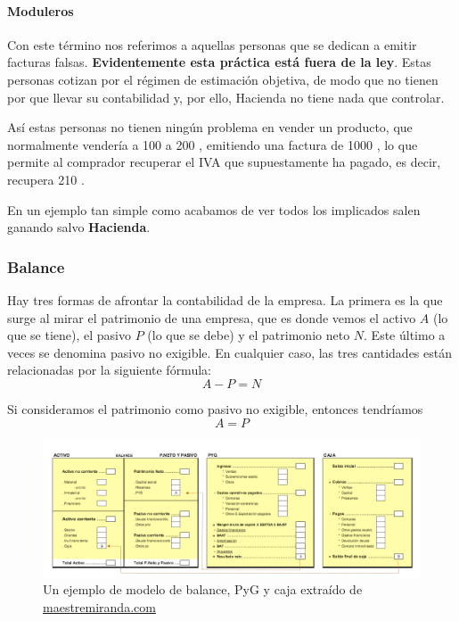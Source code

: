 \documentclass[nochap,palatino,shortheader]{apuntes}
\newcommand{\study}[1]{#1} \newcommand{\substudy}[1]{#1}
\begin{document}
\paragraph{Moduleros}

Con este término nos referimos a aquellas personas que se dedican a emitir facturas falsas. \textbf{Evidentemente esta práctica está fuera de la ley}. Estas personas cotizan por el régimen de estimación objetiva, de modo que no tienen por que llevar su contabilidad y, por ello, Hacienda no tiene nada que controlar.

Así estas personas no tienen ningún problema en vender un producto, que normalmente vendería a 100  a 200 \texteuro, emitiendo una factura de 1000 \texteuro, lo que permite al comprador recuperar el IVA que supuestamente ha pagado, es decir, recupera 210 \texteuro.

En un ejemplo tan simple como acabamos de ver todos los implicados salen ganando salvo \textbf{Hacienda}.

\subsubsection{Balance}

Hay tres formas de afrontar la contabilidad de la empresa.
La primera es la que surge al mirar el patrimonio de una empresa, que es donde vemos el \study{activo} $A$ (\substudy{lo que se tiene}), el \study{pasivo} $P$ (\substudy{lo que se debe}) y el \study{patrimonio neto} $N$. Este último a veces se denomina pasivo no exigible.
En cualquier caso, las tres cantidades están relacionadas por la siguiente fórmula:
\[ A - P = N\]

Si consideramos el patrimonio como pasivo no exigible, entonces tendríamos \[ A = P \]


\begin{figure}[hbtp]
\centering
\includegraphics[width=\textwidth]{img/Balance_PyG_Caja.png}
\caption{Un ejemplo de modelo de balance, PyG y caja extraído de \href{http://maestremiranda.com/techdir/wp-content/uploads/2015/10/EF0.-Bal_PYG_Caja.pdf}{maestremiranda.com}}
\label{fig:BalancePyGCaja}
\end{figure}
\end{document}
